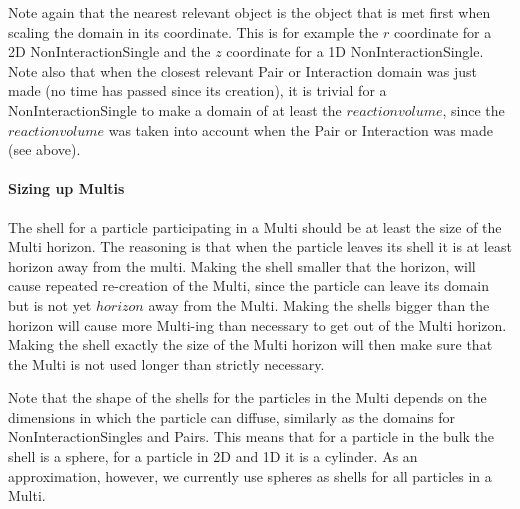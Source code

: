 \documentclass[a4paper,11pt]{article}
\begin{document}
Note again that the nearest relevant object is the object
that is met first when scaling the domain in its coordinate. This is for example the $r$ coordinate for a 2D
NonInteractionSingle and the $z$ coordinate for a 1D NonInteractionSingle.
Note also that when the closest relevant Pair or Interaction domain was just made (no time has passed since its creation), it is
trivial for a NonInteractionSingle to make a domain of at least the $reaction volume$, since the $reaction volume$ was taken
into account when the Pair or Interaction was made (see above).

\paragraph{Sizing up Multis}
The shell for a particle participating in a Multi should be at least the size of the Multi horizon. The reasoning is that
when the particle leaves its shell it is at least horizon away from the multi. Making the shell smaller that the horizon,
will cause repeated re-creation of the Multi, since the particle can leave its domain but is not yet $horizon$ away from the
Multi. Making the shells bigger than the horizon will cause more Multi-ing than necessary to get out of the Multi horizon.
Making the shell exactly the size of the Multi horizon will then make sure that the Multi is not used longer than strictly
necessary.

Note that the shape of the shells for the particles in the Multi depends on the dimensions in which the particle can diffuse,
similarly as the domains for NonInteractionSingles and Pairs. This means that for a particle in
the bulk the shell is a sphere, for a particle in 2D and 1D it is a cylinder. As an approximation, however, we currently use
spheres as shells for all particles in a Multi.
\end{document}
